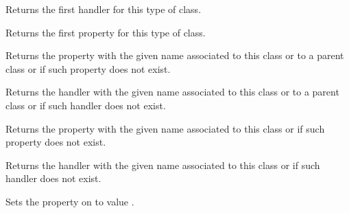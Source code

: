 Returns the first handler for this type of class.


\label{wxclassinfogetfirstproperty}


Returns the first property for this type of class.



\label{wxclassinfofindpropertyinfo}


Returns the property with the given name associated to this class or to a parent class or \NULL if
such property does not exist.


\label{wxclassinfofindhandlerinfo}


Returns the handler with the given name associated to this class or to a parent class or \NULL if
such handler does not exist.



\label{wxclassinfofindpropertyinfointhisclass}


Returns the property with the given name associated to this class or \NULL if
such property does not exist.


\label{wxclassinfofindhandlerinfointhisclass}


Returns the handler with the given name associated to this class or \NULL if
such handler does not exist.




\label{wxclassinfosetproperty}


Sets the  property on  to value .


